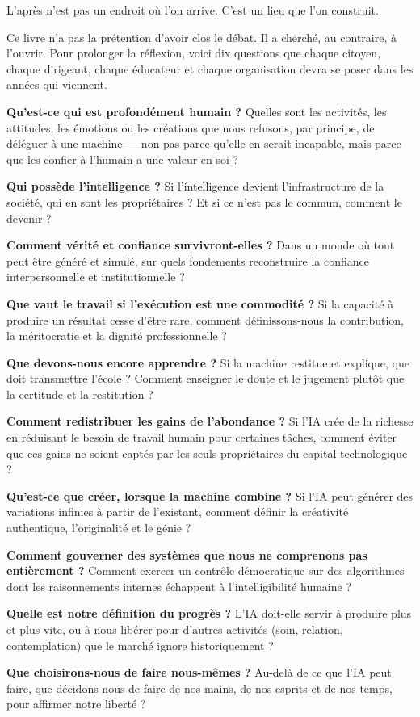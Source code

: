 L'après n'est pas un endroit où l'on arrive. C'est un lieu que l'on construit.


Ce livre n'a pas la prétention d'avoir clos le débat. Il a cherché, au contraire, à l'ouvrir. Pour prolonger la réflexion, voici dix questions que chaque citoyen, chaque dirigeant, chaque éducateur et chaque organisation devra se poser dans les années qui viennent.

\begin{questionslist}
\item \textbf{Qu'est-ce qui est profondément humain ?} Quelles sont les activités, les attitudes, les émotions ou les créations que nous refusons, par principe, de déléguer à une machine — non pas parce qu'elle en serait incapable, mais parce que les confier à l'humain a une valeur en soi ?
\item \textbf{Qui possède l'intelligence ?} Si l'intelligence devient l'infrastructure de la société, qui en sont les propriétaires ? Et si ce n'est pas le commun, comment le devenir ?
\item \textbf{Comment vérité et confiance survivront-elles ?} Dans un monde où tout peut être généré et simulé, sur quels fondements reconstruire la confiance interpersonnelle et institutionnelle ?
\item \textbf{Que vaut le travail si l'exécution est une commodité ?} Si la capacité à produire un résultat cesse d'être rare, comment définissons-nous la contribution, la méritocratie et la dignité professionnelle ?
\item \textbf{Que devons-nous encore apprendre ?} Si la machine restitue et explique, que doit transmettre l'école ? Comment enseigner le doute et le jugement plutôt que la certitude et la restitution ?
\item \textbf{Comment redistribuer les gains de l'abondance ?} Si l'IA crée de la richesse en réduisant le besoin de travail humain pour certaines tâches, comment éviter que ces gains ne soient captés par les seuls propriétaires du capital technologique ?
\item \textbf{Qu'est-ce que créer, lorsque la machine combine ?} Si l'IA peut générer des variations infinies à partir de l'existant, comment définir la créativité authentique, l'originalité et le génie ?
\item \textbf{Comment gouverner des systèmes que nous ne comprenons pas entièrement ?} Comment exercer un contrôle démocratique sur des algorithmes dont les raisonnements internes échappent à l'intelligibilité humaine ?
\item \textbf{Quelle est notre définition du progrès ?} L'IA doit-elle servir à produire plus et plus vite, ou à nous libérer pour d'autres activités (soin, relation, contemplation) que le marché ignore historiquement ?
\item \textbf{Que choisirons-nous de faire nous-mêmes ?} Au-delà de ce que l'IA peut faire, que décidons-nous de faire de nos mains, de nos esprits et de nos temps, pour affirmer notre liberté ?
\end{questionslist}

